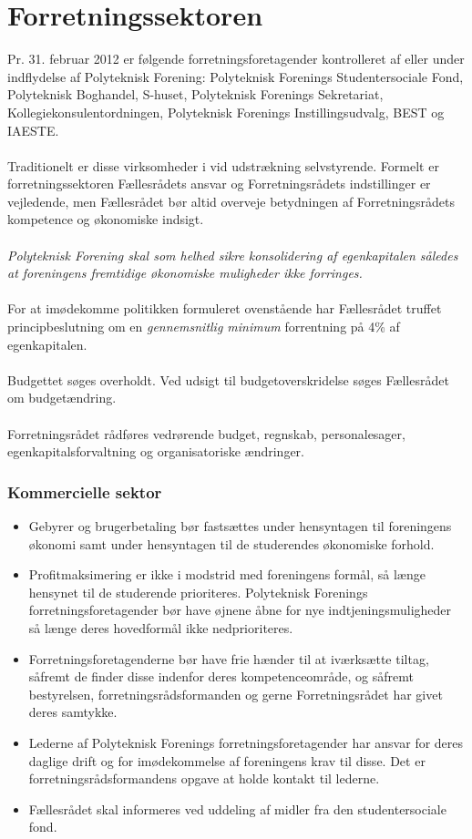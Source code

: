 \section{Forretningssektoren}
Pr. 31. februar 2012 er følgende forretningsforetagender kontrolleret af eller under indflydelse af Polyteknisk Forening: Polyteknisk Forenings Studentersociale Fond, Polyteknisk Boghandel, S-huset, Polyteknisk Forenings Sekretariat, Kollegiekonsulentordningen, Polyteknisk Forenings Instillingsudvalg, BEST og IAESTE.\\
\\
Traditionelt er disse virksomheder i vid udstrækning selvstyrende. Formelt er forretningssektoren Fællesrådets ansvar og Forretningsrådets indstillinger er vejledende, men Fællesrådet bør altid overveje betydningen af Forretningsrådets kompetence og økonomiske indsigt.\\
\\
\textit{Polyteknisk Forening skal som helhed sikre konsolidering af egenkapitalen således at foreningens fremtidige økonomiske muligheder ikke forringes.}\\
\\
For at imødekomme politikken formuleret ovenstående har Fællesrådet truffet principbeslutning om en \textit{gennemsnitlig minimum} forrentning på 4\% af egenkapitalen.\\
\\
Budgettet søges overholdt. Ved udsigt til budgetoverskridelse søges Fællesrådet om budgetændring.\\
\\
Forretningsrådet rådføres vedrørende budget, regnskab, personalesager, egenkapitalsforvaltning og organisatoriske
ændringer.

\subsubsection{Kommercielle sektor}
\begin{itemize}
\item Gebyrer og brugerbetaling bør fastsættes under hensyntagen til foreningens økonomi samt under hensyntagen til de studerendes økonomiske forhold.
\item Profitmaksimering er ikke i modstrid med foreningens formål, så længe hensynet til de studerende prioriteres. Polyteknisk Forenings forretningsforetagender bør have øjnene åbne for nye indtjeningsmuligheder så længe deres hovedformål ikke nedprioriteres.
\item Forretningsforetagenderne bør have frie hænder til at iværksætte tiltag, såfremt de finder disse indenfor deres kompetenceområde, og såfremt bestyrelsen, forretningsrådsformanden og gerne Forretningsrådet har givet deres samtykke.
\item Lederne af Polyteknisk Forenings forretningsforetagender har ansvar for deres daglige drift og for imødekommelse af foreningens krav til disse. Det er forretningsrådsformandens opgave at holde kontakt til lederne.
\item Fællesrådet skal informeres ved uddeling af midler fra den studentersociale fond.
\end{itemize}

